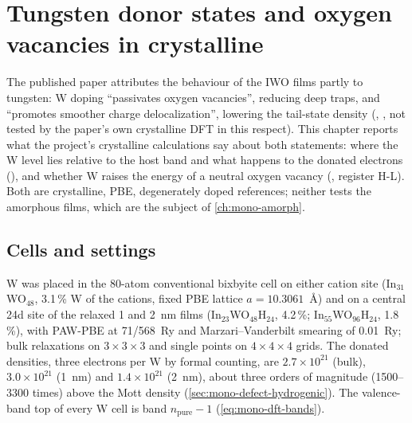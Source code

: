 \chapter{Tungsten donor states and oxygen vacancies in crystalline \texorpdfstring{\InO}{In2O3}}
\label{ch:mono-w-vac}

The published paper attributes the behaviour of the IWO films partly to tungsten: W doping ``passivates oxygen vacancies'', reducing deep traps, and ``promotes smoother charge
delocalization'', lowering the tail-state density \citep[p.~4]{Januar2026} (, , not
tested by the paper's own crystalline DFT in this respect). This chapter reports what the project's crystalline
calculations say about both statements: where the W level lies relative to the host band and what happens to the
donated electrons (), and whether W raises the energy of a neutral oxygen vacancy (, register
H-L). Both are crystalline, PBE, degenerately doped references; neither tests the amorphous films, which are the
subject of \cref{ch:mono-amorph}.

\section{Cells and settings}
\label{sec:mono-w-cells}

W was placed in the 80-atom conventional bixbyite cell on either cation site (In$_{31}$WO$_{48}$, 3.1\,\% W of the
cations, fixed PBE lattice $a = 10.3061$~\AA) and on a central 24d site of the relaxed 1 and 2~nm films
(In$_{23}$WO$_{48}$H$_{24}$, 4.2\,\%; In$_{55}$WO$_{96}$H$_{24}$, 1.8\,\%), with PAW-PBE at 71/568~Ry and
Marzari--Vanderbilt smearing of 0.01~Ry; bulk relaxations on $3\times3\times3$ and single points on $4\times4\times4$
grids. The donated densities, three electrons per W by formal counting, are $2.7\times10^{21}$ (bulk),
$3.0\times10^{21}$ (1~nm) and $1.4\times10^{21}$\cmcu{} (2~nm), about three orders of magnitude (1500--3300 times) above the
Mott density
(\cref{sec:mono-defect-hydrogenic}). The valence-band top of every W cell is band $n_{\mathrm{pure}}-1$
(\cref{eq:mono-dft-bands}).

